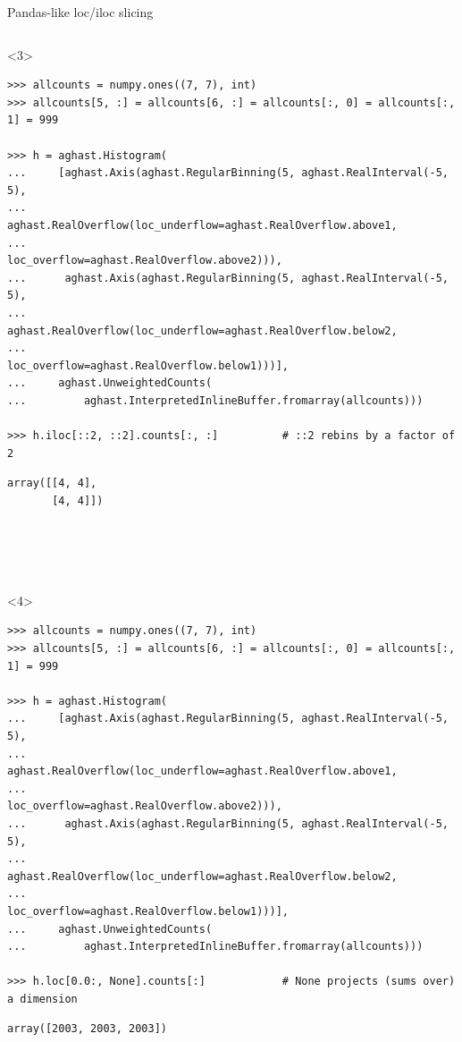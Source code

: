\documentclass[aspectratio=169]{beamer}
\begin{document}
\begin{frame}[fragile]{Pandas-like loc/iloc slicing}
\begin{onlyenv}
\begin{verbatim}
\end{verbatim}
\end{onlyenv}
\begin{onlyenv}<3>
\begin{verbatim}
>>> allcounts = numpy.ones((7, 7), int)
>>> allcounts[5, :] = allcounts[6, :] = allcounts[:, 0] = allcounts[:, 1] = 999

>>> h = aghast.Histogram(
...     [aghast.Axis(aghast.RegularBinning(5, aghast.RealInterval(-5, 5),
...                  aghast.RealOverflow(loc_underflow=aghast.RealOverflow.above1,
...                                      loc_overflow=aghast.RealOverflow.above2))),
...      aghast.Axis(aghast.RegularBinning(5, aghast.RealInterval(-5, 5),
...                  aghast.RealOverflow(loc_underflow=aghast.RealOverflow.below2,
...                                      loc_overflow=aghast.RealOverflow.below1)))],
...     aghast.UnweightedCounts(
...         aghast.InterpretedInlineBuffer.fromarray(allcounts)))

>>> h.iloc[::2, ::2].counts[:, :]          # ::2 rebins by a factor of 2
\end{verbatim}
\begin{verbatim}
array([[4, 4], 
       [4, 4]])





\end{verbatim}
\end{onlyenv}
\begin{onlyenv}<4>
\begin{verbatim}
>>> allcounts = numpy.ones((7, 7), int)
>>> allcounts[5, :] = allcounts[6, :] = allcounts[:, 0] = allcounts[:, 1] = 999

>>> h = aghast.Histogram(
...     [aghast.Axis(aghast.RegularBinning(5, aghast.RealInterval(-5, 5),
...                  aghast.RealOverflow(loc_underflow=aghast.RealOverflow.above1,
...                                      loc_overflow=aghast.RealOverflow.above2))),
...      aghast.Axis(aghast.RegularBinning(5, aghast.RealInterval(-5, 5),
...                  aghast.RealOverflow(loc_underflow=aghast.RealOverflow.below2,
...                                      loc_overflow=aghast.RealOverflow.below1)))],
...     aghast.UnweightedCounts(
...         aghast.InterpretedInlineBuffer.fromarray(allcounts)))

>>> h.loc[0.0:, None].counts[:]            # None projects (sums over) a dimension
\end{verbatim}
\begin{verbatim}
array([2003, 2003, 2003])







\end{verbatim}
\end{onlyenv}
\end{frame}
\end{document}
